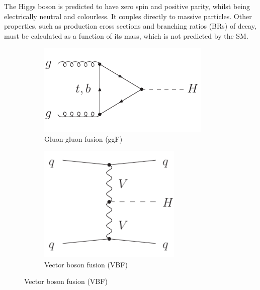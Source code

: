 
The Higgs boson is predicted to have zero spin and positive parity, whilst being 
electrically neutral and colourless. It couples directly to massive particles. Other 
properties, such as production cross sections and branching ratios (BRs) of decay, must be 
calculated as a function of its mass, which is not predicted by the SM.


\begin{figure}[b]
	\null\hfill
	\begin{subfigure}[b]{0.4\textwidth}
		\centering
		\includegraphics[width=\textwidth]{axodraw/ggF.pdf}
		\caption{Gluon-gluon fusion (ggF)}
		\label{fig:feyn:ggF}
	\end{subfigure}
	\hfill
	\begin{subfigure}[b]{0.4\textwidth}
		\centering
		\includegraphics[width=0.75\textwidth]{axodraw/VBF.pdf}
		\caption{Vector boson fusion (VBF)}
		\label{fig:feyn:VBF}

\end{subfigure}
\end{figure}
